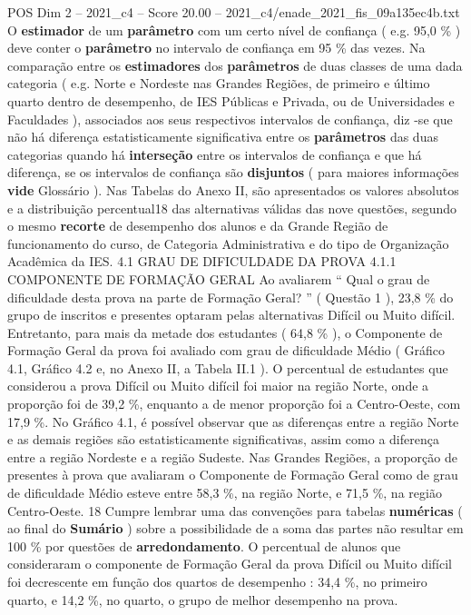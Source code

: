 \begin{textsample}{POS Dim 2 – 2021\_c4 – Score 20.00 – 2021\_c4/enade\_2021\_fis\_09a135ec4b.txt}
O \textbf{estimador} de um \textbf{parâmetro} com um certo nível de confiança ( e.g. 95,0 \% ) deve conter o \textbf{parâmetro} no intervalo de confiança em 95 \% das vezes.
Na comparação entre os \textbf{estimadores} dos \textbf{parâmetros} de duas classes de uma dada categoria ( e.g.
Norte e Nordeste nas Grandes Regiões, de primeiro e último quarto dentro de desempenho, de IES Públicas e Privada, ou de Universidades e Faculdades ), associados aos seus respectivos intervalos de confiança, diz -se que não há diferença estatisticamente significativa entre os \textbf{parâmetros} das duas categorias quando há \textbf{interseção} entre os intervalos de confiança e que há diferença, se os intervalos de confiança são \textbf{disjuntos} ( para maiores informações \textbf{vide} Glossário ).
Nas Tabelas do Anexo II, são apresentados os valores absolutos e a distribuição percentual18 das alternativas válidas das nove questões, segundo o mesmo \textbf{recorte} de desempenho dos alunos e da Grande Região de funcionamento do curso, de Categoria Administrativa e do tipo de Organização Acadêmica da IES. 4.1 GRAU DE DIFICULDADE DA PROVA 4.1.1 COMPONENTE DE FORMAÇÃO GERAL Ao avaliarem “ Qual o grau de dificuldade desta prova na parte de Formação Geral? ” ( Questão 1 ), 23,8 \% do grupo de inscritos e presentes optaram pelas alternativas Difícil ou Muito difícil.
Entretanto, para mais da metade dos estudantes ( 64,8 \% ), o Componente de Formação Geral da prova foi avaliado com grau de dificuldade Médio ( Gráfico 4.1, Gráfico 4.2 e, no Anexo II, a Tabela II.1 ).
O percentual de estudantes que considerou a prova Difícil ou Muito difícil foi maior na região Norte, onde a proporção foi de 39,2 \%, enquanto a de menor proporção foi a Centro-Oeste, com 17,9 \%.
No Gráfico 4.1, é possível observar que as diferenças entre a região Norte e as demais regiões são estatisticamente significativas, assim como a diferença entre a região Nordeste e a região Sudeste.
Nas Grandes Regiões, a proporção de presentes à prova que avaliaram o Componente de Formação Geral como de grau de dificuldade Médio esteve entre 58,3 \%, na região Norte, e 71,5 \%, na região Centro-Oeste. 18 Cumpre lembrar uma das convenções para tabelas \textbf{numéricas} ( ao final do \textbf{Sumário} ) sobre a possibilidade de a soma das partes não resultar em 100 \% por questões de \textbf{arredondamento}.
O percentual de alunos que consideraram o componente de Formação Geral da prova Difícil ou Muito difícil foi decrescente em função dos quartos de desempenho : 34,4 \%, no primeiro quarto, e 14,2 \%, no quarto, o grupo de melhor desempenho na prova.

\end{textsample}
